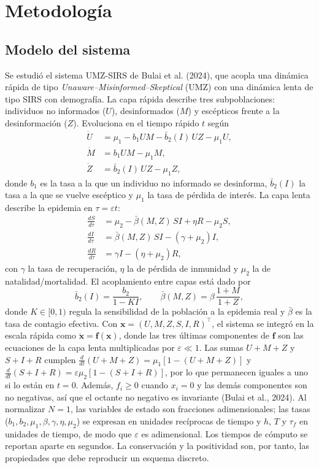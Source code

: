 \section{Metodología}\label{sec:metodologia}
\subsection{Modelo del sistema}
Se estudió el sistema UMZ-SIRS de Bulai et al. (2024), que acopla una dinámica rápida de tipo \emph{Unaware--Misinformed--Skeptical} (UMZ) con una dinámica lenta de tipo SIRS con demografía. La capa rápida describe tres subpoblaciones: individuos no informados ($U$), desinformados ($M$) y escépticos frente a la desinformación ($Z$). Evoluciona en el tiempo rápido $t$ según
\begin{align}
    \dot U &= \mu_1 - b_1 UM - \bar{b}_2(I)\,UZ - \mu_1 U, \\
    \dot M &= b_1 UM - \mu_1 M, \\
    \dot Z &= \bar{b}_2(I)\,UZ - \mu_1 Z,
\end{align}
donde $b_1$ es la tasa a la que un individuo no informado se desinforma, $\bar b_2(I)$ la tasa a la que se vuelve escéptico y $\mu_1$ la tasa de pérdida de interés. La capa lenta describe la epidemia en $\tau=\varepsilon t$:
\begin{align}
    \tfrac{dS}{d\tau} &= \mu_2 - \bar{\beta}(M,Z)\,SI + \eta R - \mu_2 S, \\
    \tfrac{dI}{d\tau} &= \bar{\beta}(M,Z)\,SI - (\gamma+\mu_2) I, \\
    \tfrac{dR}{d\tau} &= \gamma I - (\eta+\mu_2) R,
\end{align}
con $\gamma$ la tasa de recuperación, $\eta$ la de pérdida de inmunidad y $\mu_2$ la de natalidad/mortalidad. El acoplamiento entre capas está dado por
\begin{equation}
    \bar{b}_2(I) = \frac{b_2}{1-KI}, \qquad
    \bar{\beta}(M,Z) = \beta\,\frac{1+M}{1+Z},
\end{equation}
donde $K\in[0,1)$ regula la sensibilidad de la población a la epidemia real y $\bar\beta$ es la tasa de contagio efectiva. Con $\mathbf x=(U,M,Z,S,I,R)^{\top}$, el sistema se integró en la escala rápida como $\dot{\mathbf x}=\mathbf f(\mathbf x)$, donde las tres últimas componentes de $\mathbf f$ son las ecuaciones de la capa lenta multiplicadas por $\varepsilon\ll1$. Las sumas $U+M+Z$ y $S+I+R$ cumplen $\tfrac{d}{dt}(U+M+Z)=\mu_1[1-(U+M+Z)]$ y $\tfrac{d}{dt}(S+I+R)=\varepsilon\mu_2[1-(S+I+R)]$, por lo que permanecen iguales a uno si lo están en $t=0$. Además, $f_i\ge0$ cuando $x_i=0$ y las demás componentes son no negativas, así que el octante no negativo es invariante (Bulai et al., 2024). Al normalizar $N=1$, las variables de estado son fracciones adimensionales; las tasas ($b_1,b_2,\mu_1,\beta,\gamma,\eta,\mu_2$) se expresan en unidades recíprocas de tiempo y $h$, $T$ y $\tau_f$ en unidades de tiempo, de modo que $\varepsilon$ es adimensional. Los tiempos de cómputo se reportan aparte en segundos. La conservación y la positividad son, por tanto, las propiedades que debe reproducir un esquema discreto.

